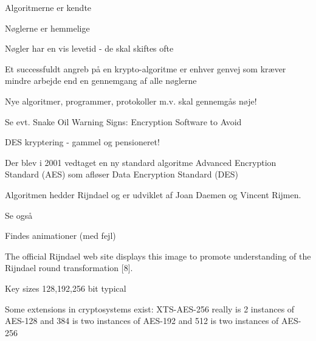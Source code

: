\documentclass[Screen16to9,17pt]{foils}
\begin{document}

\begin{list1}
\item Algoritmerne er kendte
\item Nøglerne er hemmelige
\item Nøgler har en vis levetid - de skal skiftes ofte
\item Et successfuldt angreb på en krypto-algoritme er enhver genvej
  som kræver mindre arbejde end en gennemgang af alle nøglerne
\item Nye algoritmer, programmer, protokoller m.v. skal gennemgås nøje!
\item Se evt. Snake Oil Warning Signs:
Encryption Software to Avoid\\
\end{list1}







\begin{list1}
\item DES kryptering - gammel og pensioneret!
\item Der blev i 2001 vedtaget en ny standard algoritme Advanced Encryption
  Standard (AES) som afløser Data Encryption Standard (DES)
\item Algoritmen hedder Rijndael og er udviklet
af Joan Daemen og Vincent Rijmen.
\item Se også 
\item Findes animationer (med fejl) 
\end{list1}



\begin{list2}
\item The official Rijndael web site displays this image to promote understanding of the Rijndael round transformation [8].
\item Key sizes 128,192,256 bit typical
\item Some extensions in cryptosystems exist: XTS-AES-256 really is 2 instances of AES-128 and 384 is two instances of AES-192 and 512 is two instances of AES-256
\item {}
\end{list2}
\end{document}
